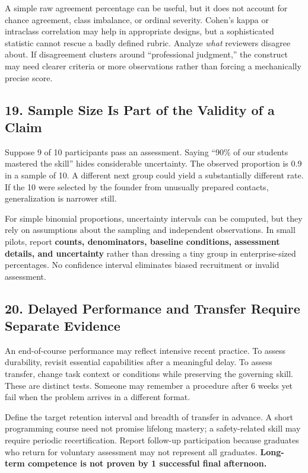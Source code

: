 A simple raw agreement percentage can be useful, but it does not account for chance agreement, class imbalance, or ordinal severity. Cohen's kappa or intraclass correlation may help in appropriate designs, but a sophisticated statistic cannot rescue a badly defined rubric. Analyze \emph{what} reviewers disagree about. If disagreement clusters around ``professional judgment,'' the construct may need clearer criteria or more observations rather than forcing a mechanically precise score.

\subsection*{19. Sample Size Is Part of the Validity of a Claim}

Suppose 9 of 10 participants pass an assessment. Saying ``90\% of our students mastered the skill'' hides considerable uncertainty. The observed proportion is 0.9 in a sample of 10. A different next group could yield a substantially different rate. If the 10 were selected by the founder from unusually prepared contacts, generalization is narrower still.

For simple binomial proportions, uncertainty intervals can be computed, but they rely on assumptions about the sampling and independent observations. In small pilots, report \textbf{counts, denominators, baseline conditions, assessment details, and uncertainty} rather than dressing a tiny group in enterprise-sized percentages. No confidence interval eliminates biased recruitment or invalid assessment.

\subsection*{20. Delayed Performance and Transfer Require Separate Evidence}

An end-of-course performance may reflect intensive recent practice. To assess durability, revisit essential capabilities after a meaningful delay. To assess transfer, change task context or conditions while preserving the governing skill. These are distinct tests. Someone may remember a procedure after 6 weeks yet fail when the problem arrives in a different format.

Define the target retention interval and breadth of transfer in advance. A short programming course need not promise lifelong mastery; a safety-related skill may require periodic recertification. Report follow-up participation because graduates who return for voluntary assessment may not represent all graduates. \textbf{Long-term competence is not proven by 1 successful final afternoon.}
